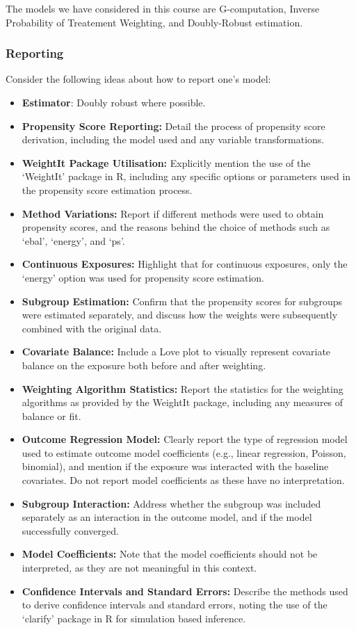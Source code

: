 \documentclass[
  singlecolumn]{article}
\providecommand{\tightlist}{%
  \setlength{\itemsep}{0pt}\setlength{\parskip}{0pt}}\usepackage{longtable,booktabs,array}
\begin{document}
The models we have considered in this course are G-computation, Inverse
Probability of Treatement Weighting, and Doubly-Robust estimation.

\hypertarget{reporting}{%
\subsubsection{Reporting}\label{reporting}}

Consider the following ideas about how to report one's model:

\begin{itemize}
\tightlist
\item
  \textbf{Estimator}: Doubly robust where possible.
\item
  \textbf{Propensity Score Reporting:} Detail the process of propensity
  score derivation, including the model used and any variable
  transformations.
\item
  \textbf{WeightIt Package Utilisation:} Explicitly mention the use of
  the `WeightIt' package in R, including any specific options or
  parameters used in the propensity score estimation process.
\item
  \textbf{Method Variations:} Report if different methods were used to
  obtain propensity scores, and the reasons behind the choice of methods
  such as `ebal', `energy', and `ps'.
\item
  \textbf{Continuous Exposures:} Highlight that for continuous
  exposures, only the `energy' option was used for propensity score
  estimation.
\item
  \textbf{Subgroup Estimation:} Confirm that the propensity scores for
  subgroups were estimated separately, and discuss how the weights were
  subsequently combined with the original data.
\item
  \textbf{Covariate Balance:} Include a Love plot to visually represent
  covariate balance on the exposure both before and after weighting.
\item
  \textbf{Weighting Algorithm Statistics:} Report the statistics for the
  weighting algorithms as provided by the WeightIt package, including
  any measures of balance or fit.
\item
  \textbf{Outcome Regression Model:} Clearly report the type of
  regression model used to estimate outcome model coefficients (e.g.,
  linear regression, Poisson, binomial), and mention if the exposure was
  interacted with the baseline covariates. Do not report model
  coefficients as these have no interpretation.
\item
  \textbf{Subgroup Interaction:} Address whether the subgroup was
  included separately as an interaction in the outcome model, and if the
  model successfully converged.
\item
  \textbf{Model Coefficients:} Note that the model coefficients should
  not be interpreted, as they are not meaningful in this context.
\item
  \textbf{Confidence Intervals and Standard Errors:} Describe the
  methods used to derive confidence intervals and standard errors,
  noting the use of the `clarify' package in R for simulation based
  inference.
\end{itemize}
\end{document}
